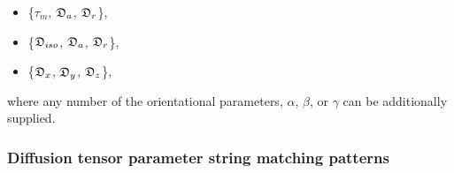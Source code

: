 \begin{itemize}
\item[] \{$\tau_m$, $\mathfrak{D}_a$, $\mathfrak{D}_r$\}, 
\item[] \{$\mathfrak{D}_{iso}$, $\mathfrak{D}_a$, $\mathfrak{D}_r$\}, 
\item[] \{$\mathfrak{D}_x$, $\mathfrak{D}_y$, $\mathfrak{D}_z$\}, 
\end{itemize}


where any number of the orientational parameters, $\alpha$, $\beta$, or $\gamma$ can be additionally supplied.



\subsubsection{Diffusion tensor parameter string matching patterns}

